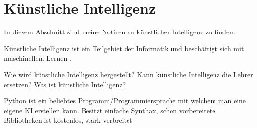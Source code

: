 \section{Künstliche Intelligenz}
\label{sec:ai}

In diesem Abschnitt sind meine Notizen zu künstlicher Intelligenz zu finden.

Künstliche Intelligenz ist ein Teilgebiet der Informatik und beschäftigt sich mit maschinellem Lernen \citep{ai-wikipedia}.




Wie wird künstliche Intelligenz hergestellt?
Kann künstliche Intelligenz die Lehrer ersetzen?
Was ist künstliche Intelligenz?



Python ist ein beliebtes Programm/Programmiersprache mit welchem man eine eigene KI erstellen kann.
Besitzt einfache Synthax, schon vorbereitete Bibliotheken
ist kostenlos, stark verbreitet